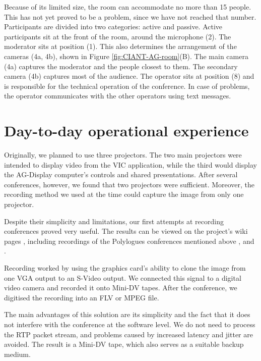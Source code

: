 Because of its limited size, the room can accommodate no more than 15 people. This has not yet proved to be a problem, since we have not reached that number. Participants are divided into two categories: active and passive. Active participants sit at the front of the room, around the microphone (2). The moderator sits at position (1). This also determines the arrangement of the cameras (4a, 4b), shown in Figure \ref{fig:CIANT-AG-room}(B). The main camera (4a) captures the moderator and the people closest to them. The secondary camera (4b) captures most of the audience. The operator sits at position (8) and is responsible for the technical operation of the conference. In case of problems, the operator communicates with the other operators using text messages.

\section{Day-to-day operational experience}\label{kap:CiantSkusenosti}

Originally, we planned to use three projectors. The two main projectors were intended to display video from the VIC application, while the third would display the AG-Display computer's controls and shared presentations.
After several conferences, however, we found that two projectors were sufficient. Moreover, the recording method we used at the time could capture the image from only one projector.

Despite their simplicity and limitations, our first attempts at recording conferences proved very useful. The results can be viewed on the project's wiki pages \cite{CIANT-AGnodeWiki}, including recordings of the Polylogues conferences mentioned above \cite{CIANT-Polylogues-1}, \cite{CIANT-Polylogues-2} and \cite{CIANT-Polylogues-3}.

Recording worked by using the graphics card's ability to clone the image from one VGA output to an S-Video output. We connected this signal to a digital video camera and recorded it onto Mini-DV tapes. After the conference, we digitised the recording into an FLV or MPEG file.

The main advantages of this solution are its simplicity and the fact that it does not interfere with the conference at the software level. We do not need to process the RTP packet stream, and problems caused by increased latency and jitter are avoided. The result is a Mini-DV tape, which also serves as a suitable backup medium.


